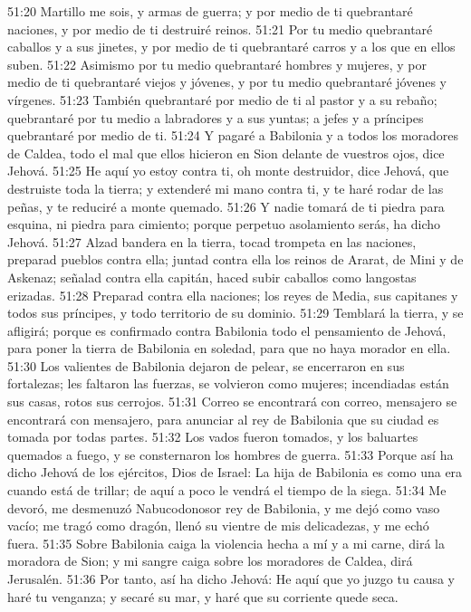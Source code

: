 51:20 Martillo me sois, y armas de guerra; y por medio de ti quebrantaré naciones, y por medio de ti destruiré reinos. 
51:21 Por tu medio quebrantaré caballos y a sus jinetes, y por medio de ti quebrantaré carros y a los que en ellos suben. 
51:22 Asimismo por tu medio quebrantaré hombres y mujeres, y por medio de ti quebrantaré viejos y jóvenes, y por tu medio quebrantaré jóvenes y vírgenes. 
51:23 También quebrantaré por medio de ti al pastor y a su rebaño; quebrantaré por tu medio a labradores y a sus yuntas; a jefes y a príncipes quebrantaré por medio de ti. 
51:24 Y pagaré a Babilonia y a todos los moradores de Caldea, todo el mal que ellos hicieron en Sion delante de vuestros ojos, dice Jehová. 
51:25 He aquí yo estoy contra ti, oh monte destruidor, dice Jehová, que destruiste toda la tierra; y extenderé mi mano contra ti, y te haré rodar de las peñas, y te reduciré a monte quemado. 
51:26 Y nadie tomará de ti piedra para esquina, ni piedra para cimiento; porque perpetuo asolamiento serás, ha dicho Jehová. 
51:27 Alzad bandera en la tierra, tocad trompeta en las naciones, preparad pueblos contra ella; juntad contra ella los reinos de Ararat, de Mini y de Askenaz; señalad contra ella capitán, haced subir caballos como langostas erizadas. 
51:28 Preparad contra ella naciones; los reyes de Media, sus capitanes y todos sus príncipes, y todo territorio de su dominio. 
51:29 Temblará la tierra, y se afligirá; porque es confirmado contra Babilonia todo el pensamiento de Jehová, para poner la tierra de Babilonia en soledad, para que no haya morador en ella. 
51:30 Los valientes de Babilonia dejaron de pelear, se encerraron en sus fortalezas; les faltaron las fuerzas, se volvieron como mujeres; incendiadas están sus casas, rotos sus cerrojos. 
51:31 Correo se encontrará con correo, mensajero se encontrará con mensajero, para anunciar al rey de Babilonia que su ciudad es tomada por todas partes. 
51:32 Los vados fueron tomados, y los baluartes quemados a fuego, y se consternaron los hombres de guerra. 
51:33 Porque así ha dicho Jehová de los ejércitos, Dios de Israel: La hija de Babilonia es como una era cuando está de trillar; de aquí a poco le vendrá el tiempo de la siega. 
51:34 Me devoró, me desmenuzó Nabucodonosor rey de Babilonia, y me dejó como vaso vacío; me tragó como dragón, llenó su vientre de mis delicadezas, y me echó fuera. 
51:35 Sobre Babilonia caiga la violencia hecha a mí y a mi carne, dirá la moradora de Sion; y mi sangre caiga sobre los moradores de Caldea, dirá Jerusalén. 
51:36 Por tanto, así ha dicho Jehová: He aquí que yo juzgo tu causa y haré tu venganza; y secaré su mar, y haré que su corriente quede seca. 
